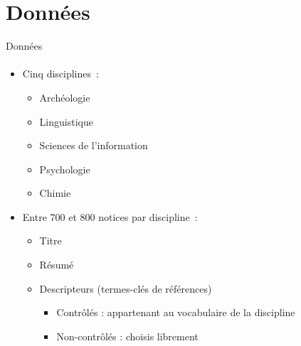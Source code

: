 \section{Données}
  \begin{frame}{Données}
    \framesubtitle{}

    \begin{itemize}
      \item{Cinq disciplines~:}
      \begin{itemize}
        \item{Archéologie}
        \item{Linguistique}
        \item{Sciences de l'information}
        \item{Psychologie}
        \item{Chimie}
      \end{itemize}
      \item<2->{Entre 700 et 800 notices par discipline~:}
      \begin{itemize}
        \item{Titre}
        \item{Résumé}
        \item{Descripteurs (termes-clés de références)}
        \begin{itemize}
          \item{Contrôlés : appartenant au vocabulaire de la discipline}
          \item{Non-contrôlés : choisis librement}
        \end{itemize}
      \end{itemize}
    \end{itemize}
  \end{frame}

